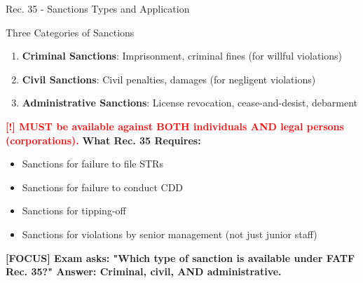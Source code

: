 \documentclass[11pt,a4paper]{beamer}
\newcommand{\redflag}[1]{\textcolor{red}{\textbf{[!] #1}}}
\newcommand{\examfocus}[1]{\textcolor{orange!80!black}{\textbf{[FOCUS] #1}}}
\begin{document}
\begin{frame}{Rec. 35 - Sanctions Types and Application}
\begin{block}{Three Categories of Sanctions}
\begin{enumerate}
\item \textbf{Criminal Sanctions}: Imprisonment, criminal fines (for willful violations)
\item \textbf{Civil Sanctions}: Civil penalties, damages (for negligent violations)
\item \textbf{Administrative Sanctions}: License revocation, cease-and-desist, debarment
\end{enumerate}
\end{block}
\redflag{MUST be available against BOTH individuals AND legal persons (corporations).}
\vspace{0.2cm}
\textbf{What Rec. 35 Requires:}
\begin{itemize}
\item Sanctions for failure to file STRs
\item Sanctions for failure to conduct CDD
\item Sanctions for tipping-off
\item Sanctions for violations by senior management (not just junior staff)
\end{itemize}
\examfocus{Exam asks: "Which type of sanction is available under FATF Rec. 35?" Answer: Criminal, civil, AND administrative.}
\end{frame}

\end{document}
